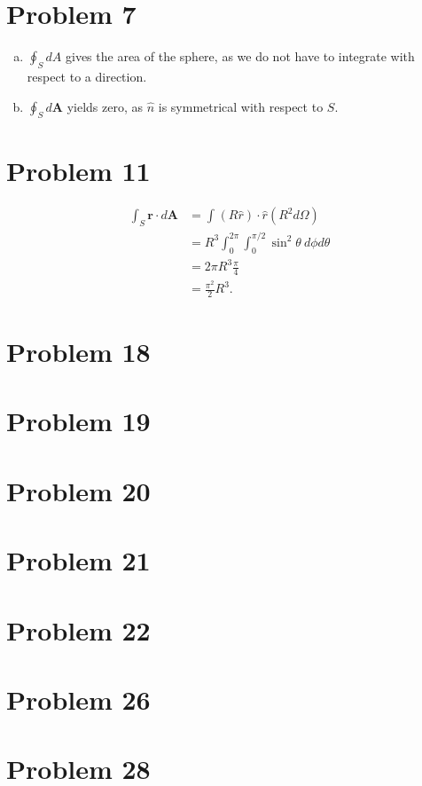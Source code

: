 \documentclass[10pt]{mypackage}
\begin{document}
\section{Problem 7}%
\begin{enumerate}[(a)]
  \item $\oint_{S}dA$ gives the area of the sphere, as we do not have to integrate with respect to a direction.
  \item $\oint_{S}d\mathbf{A}$ yields zero, as $\hat{n}$ is symmetrical with respect to $S$.
\end{enumerate}
\section{Problem 11}%
\begin{align*}
  \int_{S}^{} \mathbf{r}\cdot d\mathbf{A} &= \int_{}^{} \left(R\hat{r}\right)\cdot \hat{r}\left( R^2d\Omega\right)\\
                                          &= R^3\int_{0}^{2\pi}\int_{0}^{\pi/2}\sin^2\theta \:d\phi d\theta\\
                                          &= 2\pi R^3\frac{\pi}{4}\\
                                          &= \frac{\pi^2}{2}R^3.
\end{align*}
\section{Problem 18}%
\section{Problem 19}%
\section{Problem 20}%
\section{Problem 21}%
\section{Problem 22}%
\section{Problem 26}%
\section{Problem 28}%
\end{document}
